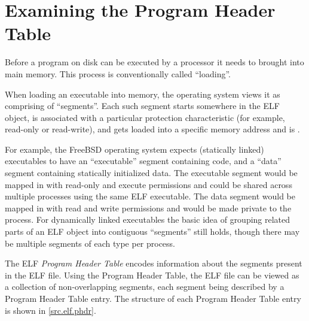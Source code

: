 \documentclass[a4paper]{book}
\newcommand{\firstterm}[1]{\textit{#1}}                 %
\begin{document}
\chapter{Examining the Program Header Table}\label{chap.elf-phdr}
Before a program on disk can be executed by a processor it needs to
brought into main memory.  This process is conventionally called
``loading''.

When loading an executable into memory, the operating system views it
as comprising of ``segments''.  Each such segment starts somewhere in
the ELF object, is associated with a particular protection
characteristic (for example, read-only or read-write), and gets loaded
into a specific memory address and is .

For example, the FreeBSD operating system expects (statically linked)
executables to have an ``executable'' segment containing code, and a
``data'' segment containing statically initialized data.  The
executable segment would be mapped in with read-only and execute
permissions and could be shared across multiple processes using the
same ELF executable.  The data segment would be mapped in with read
and write permissions and would be made private to the process.  For
dynamically linked executables the basic idea of grouping related
parts of an ELF object into contiguous ``segments'' still holds,
though there may be multiple segments of each type per process.

The ELF \firstterm{Program Header Table} encodes information about the
segments present in the ELF file.  Using the Program Header Table, the
ELF file can be viewed as a collection of non-overlapping segments,
each segment being described by a Program Header Table entry.  The
structure of each Program Header Table entry is shown in \vref{src.elf.phdr}.
\end{document}
